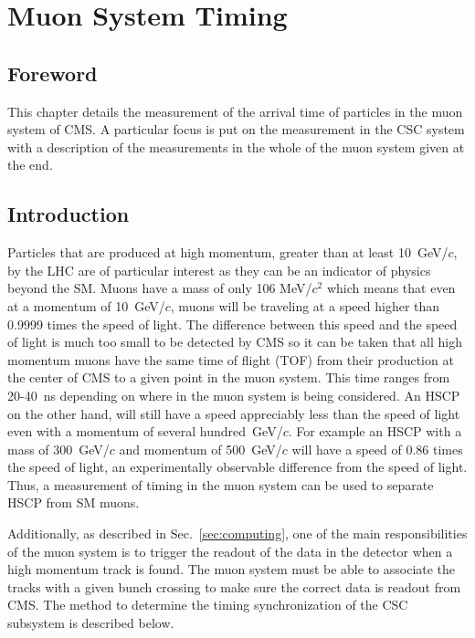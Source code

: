 \chapter{Muon System Timing \label{sec:timing}}

\section{Foreword}
This chapter details the measurement of the arrival time of particles in the muon system of CMS. A particular focus is put on the measurement in the CSC system
with a description of the measurements in the whole of the muon system given at the end. 

\section{Introduction}
Particles that are produced at high momentum, greater than at least 10~GeV/$c$, by the LHC are of particular interest as they can be an indicator of physics
beyond the SM. Muons have a mass of only 106 MeV/$c^2$ which means that even at a momentum of 10~GeV/$c$, muons will be traveling at a speed higher than 0.9999
times the speed of light. The difference between this speed and the speed of light is much too small to be detected by CMS so it can be
taken that all high momentum muons have the same time of flight (TOF) from their production at the center of CMS to a given point in the muon system.
This time ranges from 20-40~ns depending on where in the muon system is being considered. An HSCP on the other hand, will still have a speed appreciably less than the speed
of light even with a momentum of several hundred~GeV/$c$. For example an HSCP with a mass of 300~GeV/$c$ and momentum of 500~GeV/$c$ will have a speed of
0.86 times the speed of light, an experimentally observable difference from the speed of light.
Thus, a measurement of timing in the muon system can be used to separate HSCP from SM muons.

Additionally, as described in Sec.~\ref{sec:computing}, one of the main responsibilities  of the muon system is to trigger the readout of the data in the detector
when a high momentum track is found. The muon system must be able to associate the tracks with a given bunch crossing to make sure the correct data is readout from CMS.
The method to determine the timing synchronization of the CSC subsystem is described below.


